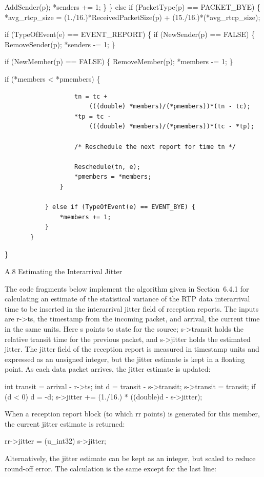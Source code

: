 \documentclass{article}
\begin{document}
AddSender(p); *senders += 1; \} \} else if (PacketType(p) == PACKET\_BYE) \{ *avg\_rtcp\_size = (1./16.)*ReceivedPacketSize(p) + (15./16.)*(*avg\_rtcp\_size);

if (TypeOfEvent(e) == EVENT\_REPORT) \{ if (NewSender(p) == FALSE) \{ RemoveSender(p); *senders -= 1; \}

if (NewMember(p) == FALSE) \{ RemoveMember(p); *members -= 1; \}

if (*members < *pmembers) \{

\begin{verbatim}
                   tn = tc +
                       (((double) *members)/(*pmembers))*(tn - tc);
                   *tp = tc -
                       (((double) *members)/(*pmembers))*(tc - *tp);

                   /* Reschedule the next report for time tn */

                   Reschedule(tn, e);
                   *pmembers = *members;
               }

           } else if (TypeOfEvent(e) == EVENT_BYE) {
               *members += 1;
           }
       }
\end{verbatim}

\}

A.8 Estimating the Interarrival Jitter

The code fragments below implement the algorithm given in Section~6.4.1 for calculating an estimate of the statistical variance of the RTP data interarrival time to be inserted in the interarrival jitter field of reception reports.  The inputs are r->ts, the timestamp from the incoming packet, and arrival, the current time in the same units. Here s points to state for the source; s->transit holds the relative transit time for the previous packet, and s->jitter holds the estimated jitter.  The jitter field of the reception report is measured in timestamp units and expressed as an unsigned integer, but the jitter estimate is kept in a floating point.  As each data packet arrives, the jitter estimate is updated:

int transit = arrival - r->ts; int d = transit - s->transit; s->transit = transit; if (d < 0) d = -d; s->jitter += (1./16.) * ((double)d - s->jitter);

When a reception report block (to which rr points) is generated for this member, the current jitter estimate is returned:

rr->jitter = (u\_int32) s->jitter;

Alternatively, the jitter estimate can be kept as an integer, but scaled to reduce round-off error.  The calculation is the same except for the last line:
\end{document}
